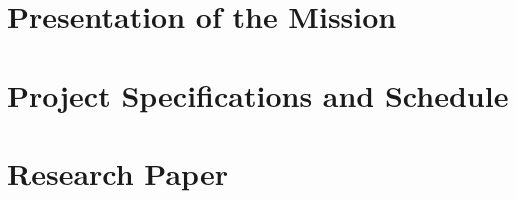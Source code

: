 \documentclass[10pt]{article}
\title{\mytitle}
\author{\myauthor}
\date{}
\begin{document}
    

    


    \section{Presentation of the Mission}\label{sec:presentation-of-the-mission}
    


    \section{Project Specifications and Schedule}\label{sec:project-specifications-and-schedule}
    


    \section{Research Paper}\label{sec:research-paper}
    

    
\end{document}
